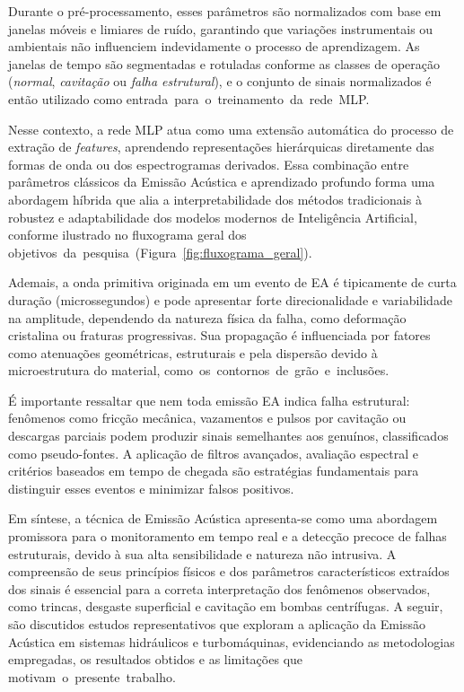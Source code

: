 Durante o pré-processamento, esses parâmetros são normalizados com base em janelas móveis e limiares de ruído, garantindo que variações instrumentais ou ambientais não influenciem indevidamente o processo de aprendizagem. As janelas de tempo são segmentadas e rotuladas conforme as classes de operação (\textit{normal}, \textit{cavitação} ou \textit{falha estrutural}), e o conjunto de sinais normalizados é então utilizado como \mbox{entrada para o treinamento da rede MLP.}

Nesse contexto, a rede MLP atua como uma extensão automática do processo de extração de \textit{features}, aprendendo representações hierárquicas diretamente das formas de onda ou dos espectrogramas derivados. Essa combinação entre parâmetros clássicos da Emissão Acústica e aprendizado profundo forma uma abordagem híbrida que alia a interpretabilidade dos métodos tradicionais à robustez e adaptabilidade dos modelos modernos de Inteligência Artificial, conforme ilustrado no fluxograma geral dos \mbox{objetivos~da pesquisa (Figura~\ref{fig:fluxograma_geral}).}

Ademais, a onda primitiva originada em um evento de EA é tipicamente de curta duração (microssegundos) e pode apresentar forte direcionalidade e variabilidade na amplitude, dependendo da natureza física da falha, como deformação cristalina ou fraturas progressivas. Sua propagação é influenciada por fatores como atenuações geométricas, estruturais e pela dispersão devido à microestrutura do material, \mbox{como os contornos de grão e inclusões.}

É importante ressaltar que nem toda emissão EA indica falha estrutural: fenômenos como fricção mecânica, vazamentos e pulsos por cavitação ou descargas parciais podem produzir sinais semelhantes aos genuínos, classificados como pseudo-fontes. A aplicação de filtros avançados, avaliação espectral e critérios baseados em tempo de chegada são estratégias fundamentais para distinguir esses eventos e minimizar falsos positivos.

Em síntese, a técnica de Emissão Acústica apresenta-se como uma abordagem promissora para o monitoramento em tempo real e a detecção precoce de falhas estruturais, devido à sua alta sensibilidade e natureza não intrusiva. A compreensão de seus princípios físicos e dos parâmetros característicos extraídos dos sinais é essencial para a correta interpretação dos fenômenos observados, como trincas, desgaste superficial e cavitação em bombas centrífugas. A seguir, são discutidos estudos representativos que exploram a aplicação da Emissão Acústica em sistemas hidráulicos e turbomáquinas, evidenciando as metodologias empregadas, os resultados obtidos e as limitações que \mbox{motivam o presente~trabalho.}

